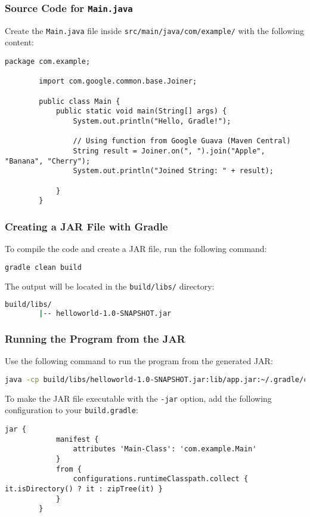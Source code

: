 \documentclass[aspectratio=169, table]{beamer}
\begin{document}
\begin{frame}[fragile]
	\frametitle{Source Code for \texttt{Main.java}}
	Create the \texttt{Main.java} file inside \texttt{src/main/java/com/example/} with the following content:
	\begin{lstlisting}[style=JavaStyle]
		package com.example;
		
		import com.google.common.base.Joiner;
		
		public class Main {
			public static void main(String[] args) {
				System.out.println("Hello, Gradle!");
				
				// Using function from Google Guava (Maven Central)
				String result = Joiner.on(", ").join("Apple", "Banana", "Cherry");
				System.out.println("Joined String: " + result);
				
			}
		}
	\end{lstlisting}
\end{frame}

\begin{frame}[fragile]
	\frametitle{Creating a JAR File with Gradle}
	To compile the code and create a JAR file, run the following command:
	\begin{lstlisting}[language=bash]
		gradle clean build
	\end{lstlisting}
	The output will be located in the \texttt{build/libs/} directory:
	\begin{lstlisting}[language=bash]
		build/libs/
		|-- helloworld-1.0-SNAPSHOT.jar
	\end{lstlisting}
\end{frame}

\begin{frame}[fragile]
	\vspace{20pt}
	\frametitle{Running the Program from the JAR}
	Use the following command to run the program from the generated JAR:
	\begin{lstlisting}[language=bash]
		java -cp build/libs/helloworld-1.0-SNAPSHOT.jar:lib/app.jar:~/.gradle/caches/modules-2/files-2.1/com.google.guava/guava/31.1-jre com.example.Main
	\end{lstlisting}
	To make the JAR file executable with the \texttt{-jar} option, add the following configuration to your \texttt{build.gradle}:
	\begin{lstlisting}[style=XmlStyle]
		jar {
			manifest {
				attributes 'Main-Class': 'com.example.Main'
			}
			from {
				configurations.runtimeClasspath.collect { it.isDirectory() ? it : zipTree(it) }
			}
		}
	\end{lstlisting}
\end{frame}
\end{document}
